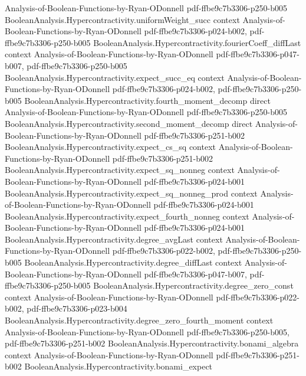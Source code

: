 \begin{theorem}
  {Analysis-of-Boolean-Functions-by-Ryan-ODonnell}
  {pdf-ffbe9c7b3306-p250-b005}
\proofstep
  {BooleanAnalysis.Hypercontractivity.uniformWeight_succ}
  {context}
  {Analysis-of-Boolean-Functions-by-Ryan-ODonnell}
  {pdf-ffbe9c7b3306-p024-b002,
    pdf-ffbe9c7b3306-p250-b005}
\proofstep
  {BooleanAnalysis.Hypercontractivity.fourierCoeff_diffLast}
  {context}
  {Analysis-of-Boolean-Functions-by-Ryan-ODonnell}
  {pdf-ffbe9c7b3306-p047-b007,
    pdf-ffbe9c7b3306-p250-b005}
\proofstep
  {BooleanAnalysis.Hypercontractivity.expect_succ_eq}
  {context}
  {Analysis-of-Boolean-Functions-by-Ryan-ODonnell}
  {pdf-ffbe9c7b3306-p024-b002,
    pdf-ffbe9c7b3306-p250-b005}
\proofstep
  {BooleanAnalysis.Hypercontractivity.fourth_moment_decomp}
  {direct}
  {Analysis-of-Boolean-Functions-by-Ryan-ODonnell}
  {pdf-ffbe9c7b3306-p250-b005}
\proofstep
  {BooleanAnalysis.Hypercontractivity.second_moment_decomp}
  {direct}
  {Analysis-of-Boolean-Functions-by-Ryan-ODonnell}
  {pdf-ffbe9c7b3306-p251-b002}
\proofstep
  {BooleanAnalysis.Hypercontractivity.expect_cs_sq}
  {context}
  {Analysis-of-Boolean-Functions-by-Ryan-ODonnell}
  {pdf-ffbe9c7b3306-p251-b002}
\proofstep
  {BooleanAnalysis.Hypercontractivity.expect_sq_nonneg}
  {context}
  {Analysis-of-Boolean-Functions-by-Ryan-ODonnell}
  {pdf-ffbe9c7b3306-p024-b001}
\proofstep
  {BooleanAnalysis.Hypercontractivity.expect_sq_nonneg_prod}
  {context}
  {Analysis-of-Boolean-Functions-by-Ryan-ODonnell}
  {pdf-ffbe9c7b3306-p024-b001}
\proofstep
  {BooleanAnalysis.Hypercontractivity.expect_fourth_nonneg}
  {context}
  {Analysis-of-Boolean-Functions-by-Ryan-ODonnell}
  {pdf-ffbe9c7b3306-p024-b001}
\proofstep
  {BooleanAnalysis.Hypercontractivity.degree_avgLast}
  {context}
  {Analysis-of-Boolean-Functions-by-Ryan-ODonnell}
  {pdf-ffbe9c7b3306-p022-b002,
    pdf-ffbe9c7b3306-p250-b005}
\proofstep
  {BooleanAnalysis.Hypercontractivity.degree_diffLast}
  {context}
  {Analysis-of-Boolean-Functions-by-Ryan-ODonnell}
  {pdf-ffbe9c7b3306-p047-b007,
    pdf-ffbe9c7b3306-p250-b005}
\proofstep
  {BooleanAnalysis.Hypercontractivity.degree_zero_const}
  {context}
  {Analysis-of-Boolean-Functions-by-Ryan-ODonnell}
  {pdf-ffbe9c7b3306-p022-b002,
    pdf-ffbe9c7b3306-p023-b004}
\proofstep
  {BooleanAnalysis.Hypercontractivity.degree_zero_fourth_moment}
  {context}
  {Analysis-of-Boolean-Functions-by-Ryan-ODonnell}
  {pdf-ffbe9c7b3306-p250-b005,
    pdf-ffbe9c7b3306-p251-b002}
\proofstep
  {BooleanAnalysis.Hypercontractivity.bonami_algebra}
  {context}
  {Analysis-of-Boolean-Functions-by-Ryan-ODonnell}
  {pdf-ffbe9c7b3306-p251-b002}
\proofstep
  {BooleanAnalysis.Hypercontractivity.bonami_expect}

\end{theorem}
